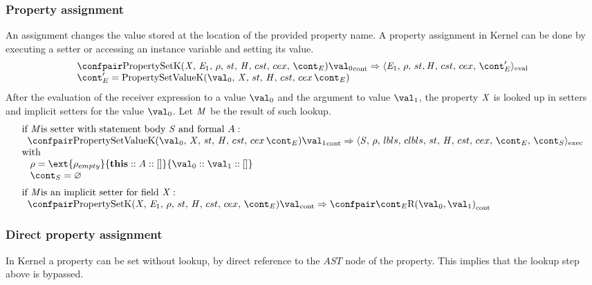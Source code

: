 \documentclass{article}
\renewcommand{\emptyset}{\varnothing}
\newcommand{\cesktrans}[2]{\ensuremath{{#1} \Rightarrow {#2}}}
\begin{document}
\subsubsection{Property assignment}
\label{subsubsec:property-assignment}
An assignment changes the value stored at the location of the provided property name.
A property assignment in Kernel can be done by executing a setter or accessing an instance variable and setting its value.
\[
  \begin{array}{lcl}
	\cesktrans{
		\contconf{\PropertySetK}{\val_0}}{
		\evalconf{\expressionmeta_1}{\env}{\strace}{\cstrace}{\cex}{\econt'}}\\
	\econt' = \PropertySetVK
  \end{array}
\]
\noindent
After the evaluation of the receiver expression to a value $\val_0$ and the argument to value $\val_1$, the property $\mathit{X}$ is looked up in setters and implicit setters for the value $\val_0$.
Let $\mathit{M}$ be the result of such lookup.
\[
  \begin{array}{lcl}
	\textrm{if \membermeta is setter with statement body }\stmt \textrm{ and formal }\formal :\\
	\hspace{2mm}
	\cesktrans{
		\contconf{\PropertySetVK}{\val_1}}{
		\execconf{\stmt}{\env}{\lbls}{\clbls}{\handler}{\cstrace}{\cex}{\econt}{\scont}}\\
	\textrm{with}\\
	\hspace{3mm}
	\env = \ext{\env_{empty}}{\mathbf{this} :: \formal :: []}{\val_0 :: \val_1 :: []}\\
	\hspace{3mm}
	\scont = \emptyset\\[2mm]

	\textrm{if \membermeta is an implicit setter for field }\idmeta :\\
	\hspace{2mm}
	\cesktrans{
		\contconf{\PropertySetK}{\val}}{
		\contconf{\econt}{\textrm{R}(\val_0, \val_1)}}
  \end{array}
\]

\subsubsection{Direct property assignment}
\label{subsubsec:direct-property-assignment}
In Kernel a property can be set without lookup, by direct reference to the $AST$ node of the property.
This implies that the lookup step above is bypassed.
\end{document}
